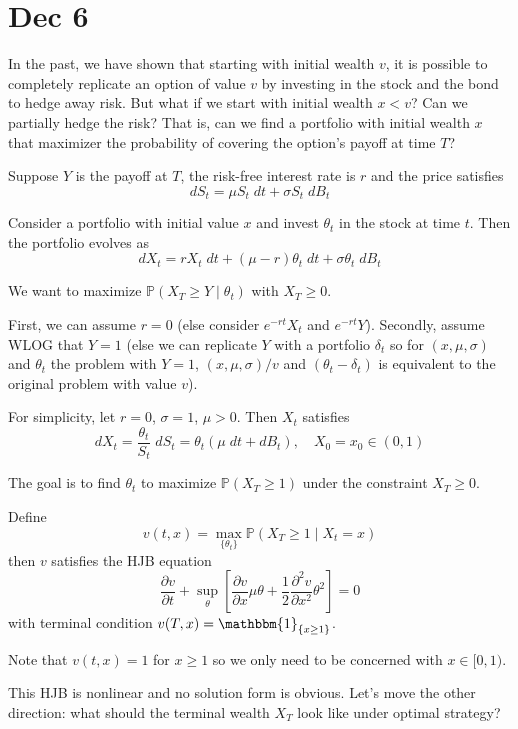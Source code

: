 \documentclass[12pt]{report}
\renewcommand{\P}{\mathbb{P}}
\newcommand{\ind}{\mathbbm{1}}
\begin{document}
\section{Dec 6}
    In the past, we have shown that starting with initial wealth $v$, it is possible to completely replicate an option of value $v$ by investing in the stock and the bond to hedge away risk. But what if we start with initial wealth $x < v$? Can we partially hedge the risk? That is, can we find a portfolio with initial wealth $x$ that maximizer the probability of covering the option's payoff at time $T$? 

    Suppose $Y$ is the payoff at $T$, the risk-free interest rate is $r$ and the price satisfies 
    \[dS_t = \mu S_t\; dt + \sigma S_t\; dB_t\] 

    Consider a portfolio with initial value $x$ and invest $\theta_t$ in the stock at time $t$. Then the portfolio evolves as 
    \[dX_t = rX_t \; dt + (\mu - r) \theta_t\; dt + \sigma \theta_t\; dB_t\]

    We want to maximize $\P(X_T \geq Y \; | \; \theta_t)$ with $X_T \geq 0$. 

    First, we can assume $r = 0$ (else consider $e^{-rt}X_t$ and $e^{-rt} Y$). Secondly, assume WLOG that $Y = 1$ (else we can replicate $Y$ with a portfolio $\delta_t$ so for $(x, \mu, \sigma)$ and $\theta_t$ the problem with $Y = 1$, $(x, \mu, \sigma)/v$ and $(\theta_t - \delta_t)$ is equivalent to the original problem with value $v$).

    For simplicity, let $r = 0$, $\sigma = 1$, $\mu > 0$. Then $X_t$ satisfies 
    \[dX_t = \frac{\theta_t}{S_t} \; dS_t = \theta_t (\mu\; dt + dB_t), \quad X_0 =x_0 \in (0, 1)\]

    The goal is to find $\theta_t$ to maximize $\P(X_T \geq 1)$ under the constraint $X_T \geq 0$. 

    Define 
    \[v(t, x) = \max_{\{\theta_t\}} \P(X_T \geq 1 \; | \; X_t = x)\]
    then $v$ satisfies the HJB equation
    \[\frac{\partial v}{\partial t} + \sup_{\theta} \left[\frac{\partial v}{\partial x} \mu \theta + \frac{1}{2} \frac{\partial^2 v}{\partial x^2} \theta^2\right] = 0\]
    with terminal condition $v(T, x) = \ind_{\{x \geq 1\}}$. 

    Note that $v(t, x) = 1$ for $x \geq 1$ so we only need to be concerned with $x \in [0, 1)$. 

    This HJB is nonlinear and no solution form is obvious. Let's move the other direction: what should the terminal wealth $X_T$ look like under optimal strategy?
\end{document}
